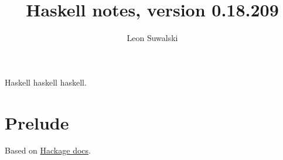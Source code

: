\documentclass{charun}
\title{Haskell notes, version 0.18.209}
\author{Leon Suwalski}
\begin{document}
\begin{multicols*}{2}
\maketitle
\raggedright
Haskell haskell haskell.
\section{Prelude}
Based on \href{https://hackage.haskell.org/package/base-4.18.0.0/docs/Prelude.html}{Hackage docs}.









\end{multicols*}
\end{document}
